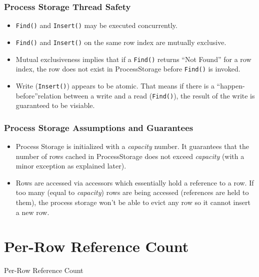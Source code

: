 \documentclass{beamer}
\begin{document}
\begin{frame}
\frametitle{Process Storage Thread Safety}
\begin{itemize}
\item \texttt{Find()} and \texttt{Insert()} may be executed concurrently.
\item \texttt{Find()} and \texttt{Insert()} on the same row index are mutually exclusive.
\item Mutual exclusiveness implies that if a \texttt{Find()} returns ``Not Found''
for a row index, the row does not exist in ProcessStorage before \texttt{Find()} is 
invoked.
\item Write (\texttt{Insert()}) appears to be atomic. That means if there is a 
``happen-before''relation between a write and a read (\texttt{Find()}), the 
result of the write is guaranteed to be visiable.
\end{itemize}
\end{frame}

\begin{frame}
\frametitle{Process Storage Assumptions and Guarantees}
\begin{itemize}
\item Process Storage is initialized with a \emph{capacity} number. It 
guarantees that the number of rows cached in ProcessStorage does not exceed 
\emph{capacity} (with a minor exception as explained later).

\item Rows are accessed via accessors which essentially hold a reference to
a row. If too many (equal to \emph{capacity}) rows are being accessed 
(references are held to them), the process storage won't be able to evict
any row so it cannot insert a new row.
\end{itemize}
\end{frame}

\section{Per-Row Reference Count}

\begin{frame}
Per-Row Reference Count
\end{frame}
\end{document}
